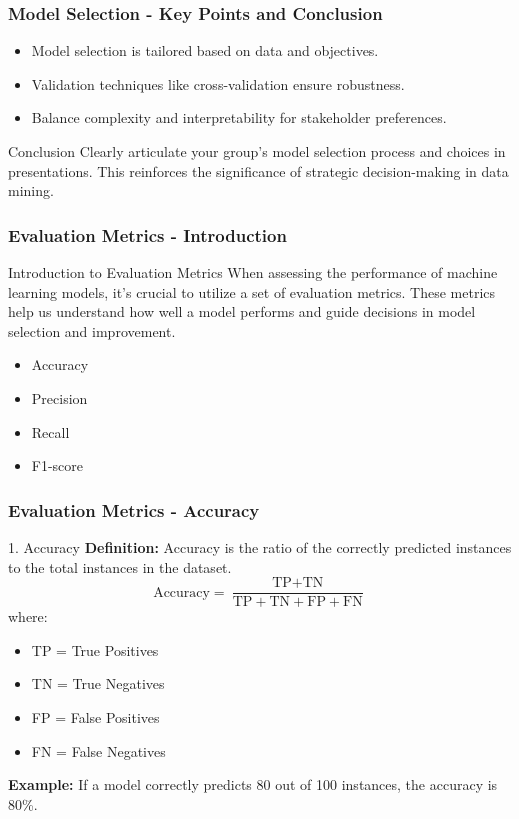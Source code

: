 \documentclass[aspectratio=169]{beamer}
\begin{document}
\begin{frame}[fragile]
    \frametitle{Model Selection - Key Points and Conclusion}
    \begin{itemize}
        \item Model selection is tailored based on data and objectives.
        \item Validation techniques like cross-validation ensure robustness.
        \item Balance complexity and interpretability for stakeholder preferences.
    \end{itemize}
    \begin{block}{Conclusion}
        Clearly articulate your group's model selection process and choices in presentations. This reinforces the significance of strategic decision-making in data mining.
    \end{block}
\end{frame}

\begin{frame}[fragile]
    \frametitle{Evaluation Metrics - Introduction}
    \begin{block}{Introduction to Evaluation Metrics}
        When assessing the performance of machine learning models, it's crucial to utilize a set of evaluation metrics. These metrics help us understand how well a model performs and guide decisions in model selection and improvement.
    \end{block}
    \begin{itemize}
        \item Accuracy
        \item Precision
        \item Recall
        \item F1-score
    \end{itemize}
\end{frame}

\begin{frame}[fragile]
    \frametitle{Evaluation Metrics - Accuracy}
    \begin{block}{1. Accuracy}
        \textbf{Definition:} Accuracy is the ratio of the correctly predicted instances to the total instances in the dataset.
        \begin{equation}
            \text{Accuracy} = \frac{\text{TP} + \text{TN}}{\text{TP} + \text{TN} + \text{FP} + \text{FN}}
        \end{equation}
        where:
        \begin{itemize}
            \item TP = True Positives
            \item TN = True Negatives
            \item FP = False Positives
            \item FN = False Negatives
        \end{itemize}
        \textbf{Example:} If a model correctly predicts 80 out of 100 instances, the accuracy is 80\%.
    \end{block}
\end{frame}
\end{document}
